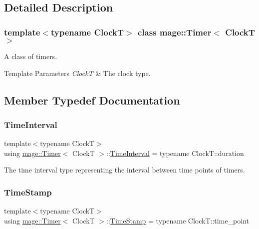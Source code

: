\subsection{Detailed Description}
\subsubsection*{template$<$typename ClockT$>$\newline
class mage\+::\+Timer$<$ Clock\+T $>$}

A class of timers.


\begin{DoxyTemplParams}{Template Parameters}
{\em ClockT} & The clock type. \\
\hline
\end{DoxyTemplParams}


\subsection{Member Typedef Documentation}
\mbox{\label{classmage_1_1_timer_a5c0fd78ceab0110637622bd0e9b8424d}} 
\subsubsection{\texorpdfstring{Time\+Interval}{TimeInterval}}
{\footnotesize\ttfamily template$<$typename ClockT$>$ \\
using \mbox{\hyperlink{classmage_1_1_timer}{mage\+::\+Timer}}$<$ ClockT $>$\+::\mbox{\hyperlink{classmage_1_1_timer_a5c0fd78ceab0110637622bd0e9b8424d}{Time\+Interval}} =  typename Clock\+T\+::duration\hspace{0.3cm}{\ttfamily [private]}}

The time interval type representing the interval between time points of timers. \mbox{\label{classmage_1_1_timer_abd11aea6107940b09ef3c48f62c81668}} 
\subsubsection{\texorpdfstring{Time\+Stamp}{TimeStamp}}
{\footnotesize\ttfamily template$<$typename ClockT$>$ \\
using \mbox{\hyperlink{classmage_1_1_timer}{mage\+::\+Timer}}$<$ ClockT $>$\+::\mbox{\hyperlink{classmage_1_1_timer_abd11aea6107940b09ef3c48f62c81668}{Time\+Stamp}} =  typename Clock\+T\+::time\+\_\+point\hspace{0.3cm}{\ttfamily [private]}}

